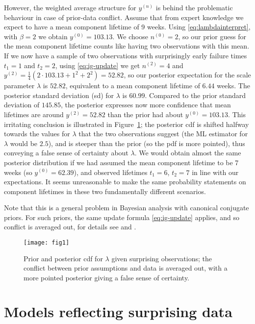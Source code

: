 \documentclass[Journal,SectionNumbers,InsideFigs]{ascelike}
\newcommand{\uz}{^{(0)}} %
\newcommand{\un}{^{(n)}} %
\def\yz{y\uz}
\def\yn{y\un}
\newcommand{\yfun}[1]{y^{({#1})}}
\def\nz{n\uz}
\newcommand{\nfun}[1]{n^{({#1})}}
\begin{document}
However, the weighted average structure for $\yn$
is behind the problematic behaviour in case of prior-data conflict.
Assume that from expert knowledge we expect
to have a mean component lifetime of 9 weeks.
Using \eqref{eq:lambdainterpret}, with $\beta=2$ we obtain $\yz = 103.13$.
We choose $\nz = 2$, so our prior guess for the mean component lifetime
counts like having two observations with this mean.
If we now have a sample of two observations
with surprisingly early failure times $t_1 = 1$ and $t_2 = 2$,
using \eqref{eq:ig-update} we get $\nfun{2} = 4$
and $\yfun{2} = \frac{1}{4}(2 \cdot 103.13 + 1^2 + 2^2) = 52.82$,
so our posterior expectation for the scale parameter $\lambda$ is $52.82$,
equivalent to a mean component lifetime of $6.44$ weeks.
The posterior standard deviation (sd) for $\lambda$ is $60.99$.
Compared to the prior standard deviation of $145.85$,
the posterior expresses now more confidence that mean lifetimes are around $\yfun{2} = 52.82$
than the prior had about $\yz = 103.13$.
This irritating conclusion is illustrated in Figure~\ref{fig:weibull-pdc};
the posterior cdf is shifted halfway towards the values for $\lambda$
that the two observations suggest
(the ML estimator for $\lambda$ would be $2.5$),
and is steeper than the prior (so the pdf is more pointed),
thus conveying a false sense of certainty about $\lambda$.
We would obtain almost the same %
posterior distribution
if we had assumed the mean component lifetime to be 7 weeks (so $\yz = 62.39$),
and observed lifetimes $t_1 = 6$, $t_2 = 7$ in line with our expectations.
It seems unreasonable to make the same probability statements on component lifetimes in these two fundamentally different scenarios.

Note that this is a general problem in Bayesian analysis with canonical conjugate priors.
For such priors, the same update formula \eqref{eq:ig-update} applies,
and so conflict is averaged out, for details see  and .
%
\begin{figure}
\centering
\texttt{[image: fig1]}
\caption{Prior and posterior cdf for $\lambda$ given surprising observations;
the conflict between prior assumptions and data is averaged out,
with a more pointed posterior giving a false sense of certainty.}
\label{fig:weibull-pdc}
\end{figure}


\section{Models reflecting surprising data}
\label{sec:modforsurpr}
\end{document}
